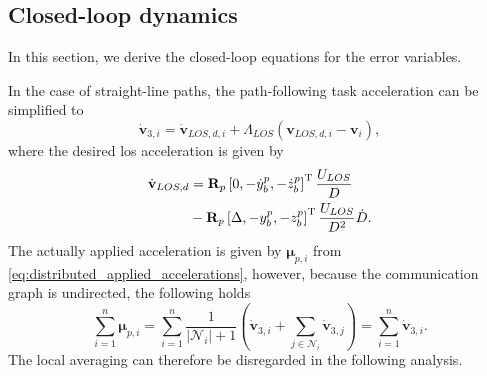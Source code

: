 \subsection{Closed-loop dynamics}
In this section, we derive the closed-loop equations for the error variables.

In the case of straight-line paths, the path-following task acceleration can be simplified to
\begin{equation}
    \dot{\mathbf{v}}_{3,i} = \dot{\mathbf{v}}_{LOS,d,i} + \Lambda_{LOS}(\mathbf{v}_{LOS,d,i} - \mathbf{v}_i),
\end{equation}
where the desired \gls{los} acceleration is given by
\begin{equation}\label{eq:desired_LOS_derivative_simplified}
\begin{split}
        \dot{\mathbf{v}}_{LOS,d} &= \mathbf{R}_p \left[ 0, -\dot{y}_b^p, -\dot{z}_b^p \right]^{\rm T} \frac{U_{LOS}}{D}\\ &- \mathbf{R}_p \left[ \Delta, -y_b^p, -z_b^p \right]^{\rm T} \frac{U_{LOS}}{D^2}\dot{D}.
    \end{split}
\end{equation}
The actually applied acceleration is given by $\bm{\mu}_{p,i}$ from \eqref{eq:distributed_applied_accelerations}, however, because the communication graph is undirected, the following holds
\begin{equation}
    \sum_{i=1}^n \bm{\mu}_{p,i} = \sum_{i=1}^n \frac{1}{|\mathcal{N}_i|+1}\left(\dot{\mathbf{v}}_{3,i}+\sum_{j\in\mathcal{N}_i} \dot{\mathbf{v}}_{3,j}\right) = \sum_{i=1}^n \dot{\mathbf{v}}_{3,i}.
\end{equation}
The local averaging can therefore be disregarded in the following analysis.

